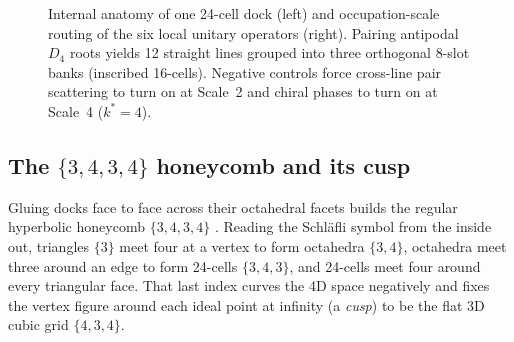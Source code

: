 \begin{figure}[htbp]
\caption{Internal anatomy of one 24-cell dock (left) and occupation-scale routing of the six local unitary operators
(right). Pairing antipodal $D_4$ roots yields 12 straight lines grouped into three orthogonal 8-slot banks (inscribed
16-cells). Negative controls force cross-line pair scattering to turn on at Scale~2 and chiral phases to turn on at
Scale~4 ($k^* = 4$).}
\label{fig:dock-24cell}
\end{figure}

\subsection{The \texorpdfstring{$\{3,4,3,4\}$}{\{3,4,3,4\}} honeycomb and its cusp}

Gluing docks face to face across their octahedral facets builds the regular hyperbolic honeycomb $\{3,4,3,4\}$
\cite{coxeter1956, coxeter1973, margenstern2007vol1}. Reading the Schl\"afli symbol from the inside out, triangles
$\{3\}$ meet four at a vertex to form octahedra $\{3,4\}$, octahedra meet three around an edge to form 24-cells
$\{3,4,3\}$, and 24-cells meet four around every triangular face. That last index curves the 4D space negatively and
fixes the vertex figure around each ideal point at infinity (a \emph{cusp}) to be the flat 3D cubic grid $\{4,3,4\}$.

